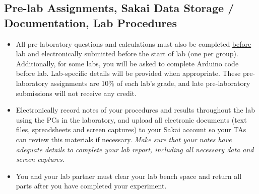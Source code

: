 \subsection{Pre-lab Assignments, Sakai Data Storage / Documentation, Lab Procedures}
\begin{itemize}
    \item All pre-laboratory questions and calculations must also be completed
        \underline{before} lab and electronically submitted before the start of
        lab (one per group). Additionally, for some labs, you will be asked to
        complete Arduino code before lab.  Lab-specific details will be
        provided when appropriate.  These pre-laboratory assignments are 
        10\% of each lab's grade, and late pre-laboratory submissions will not
        receive any credit.
    \item Electronically record notes of your procedures and results throughout
        the lab using the PCs in the laboratory, and upload all electronic
        documents (text files, spreadsheets and screen captures) to your Sakai
        account so your TAs can review this materials if necessary.  \emph{Make
            sure that your notes have adequate details to complete your lab
            report, including all necessary data and screen captures.}
    \item You and your lab partner must clear your lab bench space and
        return all parts after you have completed your experiment.  
\end{itemize}

